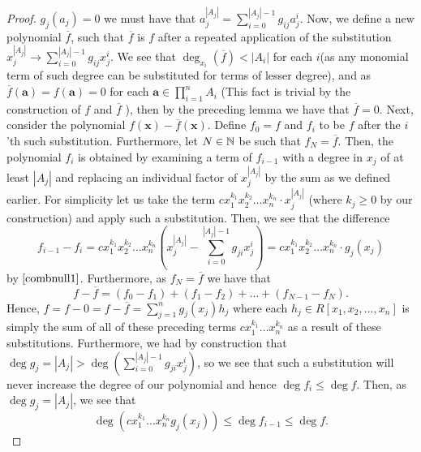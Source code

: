 \begin{proof}
$g_j\left( a_j \right) = 0$ we must have that $a_j ^{ \left| A_j \right| } =
\sum_{i=0}^{\left| A_j \right| - 1 } g_{ij} a_j ^{ i}$. Now, we define a new polynomial \(\overline{f}\), such that \(\overline{f}\) is \(f\) after a repeated application of the substitution \(x_{j}^{\left| A_{j} \right|} \to \sum_{i=0}^{\left| A_{j} \right| - 1 } g_{ij} x_{j}^{i}\). We see that $\deg _{x_{i}}
\left( \overline{f} \right) < \left| A_i \right| $ for each $i$(as any monomial term of such degree can be substituted for terms of lesser degree), and as
$\overline{f}\left( \textbf{a} \right)  = f\left( \textbf{a} \right) = 0$ for
each $ \textbf{a}\in \prod_{i= 1}^{n} A_i$ (This fact is trivial by the
construction of $f$ and $\overline{f}$ ), then by the preceding lemma we
have that $\overline{f} = 0$.  Next, consider the polynomial $f\left(
\textbf{x} \right)  - \overline{f} \left( \textbf{x} \right) $. Define $f_0 =
f$ and $f_i$ to be $f$ after the $i $'th such substitution. Furthermore, let $N \in \mathbb{N}$ be such that  $f_N =
\overline{f}$. Then, the polynomial $f_i$ is obtained by examining a term of
$f_{i-1}$ with a degree in $x_{j}$ of at least $\left| A_j \right| $ and
replacing an individual factor of $x_{j} ^{ \left| A_j \right| }$ by the sum as
we defined earlier. For simplicity let us take the term
$cx_1^{k_1}x_2^{k_2}\ldots x_{n}^{k_n} \cdot x_{j} ^{\left| A_j \right| }$
(where $k_j \ge 0$ by our construction) and apply such a substitution. Then, we
see that the difference \[f_{i-1} - f_i = cx_1^{k_1}x_2^{k_2}\ldots x_{n}^{
k_n} \left(x_{j}^{\left| A_j \right|}  - \sum_{i=0}^{\left| A_j \right| -1}
g_{ji} x_j ^{i}\right) = cx_1^{k_1}x_2^{k_2}\ldots x_{n}^{k_n} \cdot g_j
\left( x_j \right)\] by \(\refeq{combnull1}\). Furthermore, as $f_N =
\overline{f}$ we have that \[ f - \overline{f} = \left( f_0 - f_1 \right) +
\left( f_1 - f_2 \right) + \ldots + \left( f_{N-1} - f_N \right) .\] Hence,
$f = f - 0 = f - \overline{f} = \sum_{j=1}^{n} g_j \left( x_{j} \right) h_j$
where each $h_j \in R[x_1, x_2, \ldots, x_{n}]$ is simply the sum of all of
these preceding terms $cx_1^{k_1}\ldots x_{n}^{ k_n}$ as a result of these
substitutions.
Furthermore, we had by construction that $\deg g_j = \left| A_{j} \right| > \deg
\left( \sum_{i=0}^{\left| A_j \right| -1} g_{ji} x_{j}^{i} \right) $, so we see
that such a substitution will never increase the degree of our polynomial and
hence $\deg f_i \le \deg f$. Then, as $\deg g_j = \left| A_j \right| $, we see
that \[\deg\left( cx_1^{k_1}\ldots x_{n}^{k_n}g_j(x_j) \right) \le \deg
f_{i-1} \le \deg f.\]


\end{proof}
